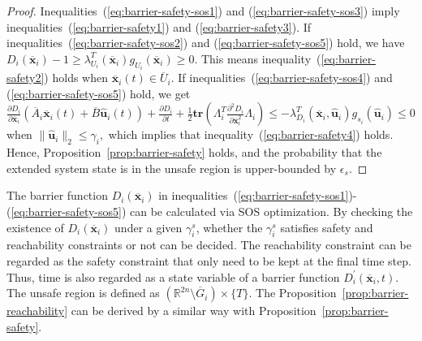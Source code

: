 \documentclass[journal]{IEEEtran}
\begin{document}
\begin{proof}
Inequalities~(\ref{eq:barrier-safety-sos1}) and (\ref{eq:barrier-safety-sos3}) imply inequalities~(\ref{eq:barrier-safety1}) and (\ref{eq:barrier-safety3}). If inequalities~(\ref{eq:barrier-safety-sos2}) and (\ref{eq:barrier-safety-sos5}) hold, we have $D_i(\overline{\mathbf{x}}_i) - 1 \geq \lambda_{U_i}^{T}(\overline{\mathbf{x}}_i)g_{U_i}(\overline{\mathbf{x}}_i)  \geq 0.$ This means inequality~(\ref{eq:barrier-safety2}) holds when $\overline{\mathbf{x}}_i(t) \in \overline{U}_i$. If inequalities~(\ref{eq:barrier-safety-sos4}) and (\ref{eq:barrier-safety-sos5}) hold, we get $\frac{\partial D_i}{\partial \overline{\mathbf{x}}_i}(\overline{A}_i\overline{\mathbf{x}}_i(t) + \overline{B}\hat{\mathbf{u}}_i(t)) + \frac{\partial D_i}{\partial t} + \frac{1}{2}\mathbf{tr}(\Lambda_i^{T}\frac{\partial^{2}D_i}{\partial \overline{\mathbf{x}}_i^{2}}\Lambda_i)   \leq - \lambda_{D_i}^{T}(\overline{\mathbf{x}}_i,\hat{\mathbf{u}}_i)g_{s_i}(\hat{\mathbf{u}}_i) \leq 0 $ when $\|\hat{\mathbf{u}}_i\|_{2} \leq \gamma_i,$ which implies that inequality~(\ref{eq:barrier-safety4}) holds. Hence, Proposition~\ref{prop:barrier-safety} holds, and the probability that the extended system state is in the unsafe region is upper-bounded by $\epsilon_s.$ 
\end{proof}

The barrier function $D_i(\overline{\mathbf{x}}_i)$ in inequalities~(\ref{eq:barrier-safety-sos1})-(\ref{eq:barrier-safety-sos5}) can be calculated via SOS optimization. By checking the existence of $D_i(\overline{\mathbf{x}}_i)$ under a given $\gamma^s_i$, whether the $\gamma^s_i$ satisfies safety and reachability constraints or not can be decided. 
The reachability constraint can be regarded as the safety constraint that only need to be kept at the final time step. Thus, time is also regarded as a state variable of a barrier function $D_i^{'}(\overline{\mathbf{x}}_i, t)$. The unsafe region is defined as $(\mathbb{R}^{2n} \setminus \overline{G}_i) \times \{T\}$. The Proposition~\ref{prop:barrier-reachability} can be derived by a similar way with Proposition~\ref{prop:barrier-safety}. 
\end{document}
